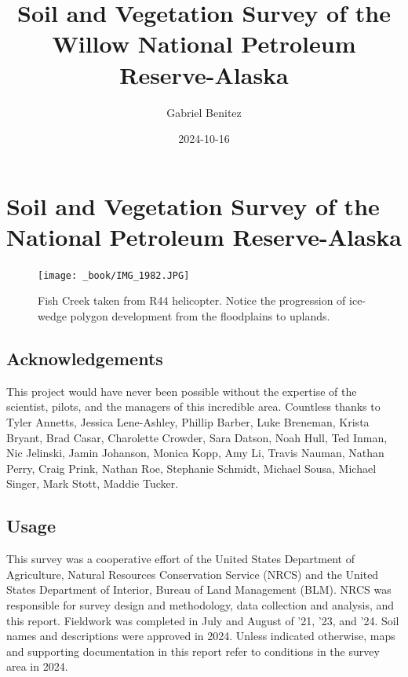 \documentclass[
]{book}
\title{Soil and Vegetation Survey of the Willow National Petroleum Reserve-Alaska}
\author{Gabriel Benitez}
\date{2024-10-16}
\theoremstyle{definition}
\theoremstyle{definition}
\theoremstyle{definition}
\theoremstyle{definition}
\theoremstyle{remark}
\begin{document}
\maketitle

{
\setcounter{tocdepth}{1}
\tableofcontents
}
\hypertarget{soil-and-vegetation-survey-of-the-national-petroleum-reserve-alaska}{%
\chapter{\texorpdfstring{Soil and Vegetation Survey of the National Petroleum Reserve-Alaska}{Soil and Vegetation Survey of the   National Petroleum Reserve-Alaska}}\label{soil-and-vegetation-survey-of-the-national-petroleum-reserve-alaska}}

\begin{figure}
\centering
\texttt{[image: \_book/IMG\_1982.JPG]}
\caption{Fish Creek taken from R44 helicopter. Notice the progression of ice-wedge polygon development from the floodplains to uplands.}
\end{figure}

\hypertarget{acknowledgements}{%
\section{Acknowledgements}\label{acknowledgements}}

This project would have never been possible without the expertise of the scientist, pilots, and the managers of this incredible area. Countless thanks to Tyler Annetts, Jessica Lene-Ashley, Phillip Barber, Luke Breneman, Krista Bryant, Brad Casar, Charolette Crowder, Sara Datson, Noah Hull, Ted Inman, Nic Jelinski, Jamin Johanson, Monica Kopp, Amy Li, Travis Nauman, Nathan Perry, Craig Prink, Nathan Roe, Stephanie Schmidt, Michael Sousa, Michael Singer, Mark Stott, Maddie Tucker.

\hypertarget{usage}{%
\section{Usage}\label{usage}}

This survey was a cooperative effort of the United States Department of Agriculture, Natural Resources Conservation Service (NRCS) and the United States Department of Interior, Bureau of Land Management (BLM). NRCS was responsible for survey design and methodology, data collection and analysis, and this report. Fieldwork was completed in July and August of '21, '23, and '24. Soil names and descriptions were approved in 2024. Unless indicated otherwise, maps and supporting documentation in this report refer to conditions in the survey area in 2024.
\end{document}
